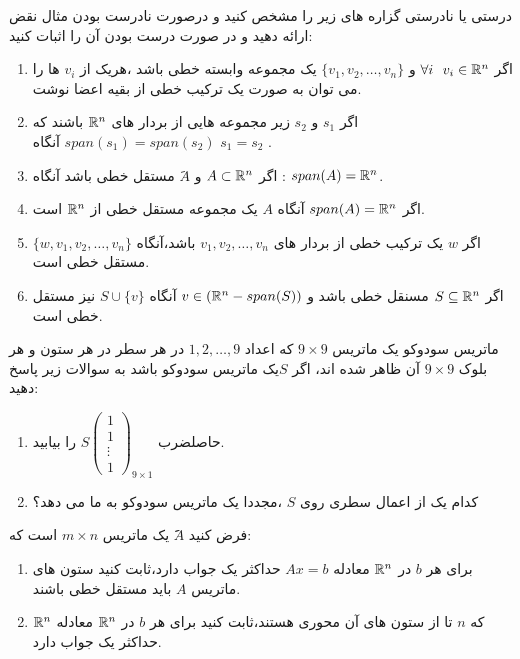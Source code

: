 \documentclass{article}
\begin{document}
درستی یا نادرستی گزاره های زیر را مشخص کنید و درصورت نادرست بودن مثال نقض ارائه دهید و در صورت درست بودن آن را اثبات کنید:
\begin{enumerate}
	\item 
اگر 
$\forall i\ \ v_i\in {\Bbb R}^n$
و 
$\{v_1,v_2,\ldots,v_n \}$
یک مجموعه وابسته خطی باشد ،هریک از $v_i$ ها را می توان به صورت یک ترکیب خطی از بقیه اعضا نوشت.
\\
\item 
اگر $s_1 $ و $s_2 $  زیر مجموعه هایی از بردار های 
${\Bbb R}^n$
باشند که 
$span(s_1)=span(s_2)$
آنگاه 
$s_1=s_2$
.
\\
\item 
اگر
$A\subset {\Bbb R}^n$
و $َA$ مستقل خطی باشد آنگاه :
$span(A)={\Bbb R}^n$.
\\
\item 
اگر 
$span(A)={\Bbb R}^n$
آنگاه $A$ یک مجموعه مستقل خطی از
${\Bbb R}^n$
است.
\\
\item
اگر 
$w$
یک ترکیب خطی از بردار های 
$v_1,v_2,\ldots,v_n$
باشد،آنگاه 
$\{w,v_1,v_2,\ldots,v_n\}$
مستقل خطی است.
\\
\item 
اگر 
$S \subseteq {\Bbb R}^n$
مسنقل خطی باشد و 
$v \in ({{\Bbb R}^n}-span(S))$
آنگاه 
$S\cup \{v\}$
نیز مستقل خطی است.
\end{enumerate}

 ماتریس سودوکو یک ماتریس 
$9\times 9$
که اعداد 
$1,2,\ldots,9$
در هر سطر در هر ستون و هر بلوک 
$9\times 9$
آن ظاهر شده اند، اگر $S$یک ماتریس سودوکو باشد به سوالات زیر پاسخ دهید:
\\
\begin{enumerate}
	\item 
حاصلضرب 
$S {\left(\begin{array}{ccc}
	1\\
	1\\
	\vdots\\
	1
	\end{array}\right)_{9\times 1}}$
را بیابید.
\\
\item
کدام یک از اعمال سطری روی 
$S$
،مجددا یک ماتریس سودوکو به ما می دهد؟
\end{enumerate}

 فرض کنید 
$ََA$
یک ماتریس 
$m\times n$
است که:
\\
\begin{enumerate}
	\item 
برای هر $b$  در 
${\Bbb R}^n$
معادله 
$Ax=b$
حداکثر یک جواب دارد،ثابت کنید ستون های ماتریس 
$A$
باید مستقل خطی باشند.
\\
\item
که $n$ تا از ستون های آن محوری هستند،ثابت کنید برای هر $b$  در 
${\Bbb R}^n$
معادله ${\Bbb R}^n$ حداکثر یک جواب دارد.
\end{enumerate}
\end{document}
